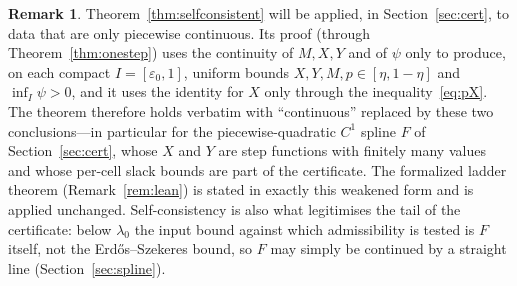 \documentclass[11pt]{article}
\theoremstyle{definition}
\newtheorem{remark}[theorem]{Remark}
\newcommand{\eps}{\varepsilon}
\newcommand{\lam}{\lambda}
\begin{document}
\begin{remark}\label{rem:weak}
Theorem~\ref{thm:selfconsistent} will be applied, in Section~\ref{sec:cert}, to data that are only piecewise continuous.  Its proof (through Theorem~\ref{thm:onestep}) uses the continuity of $M,X,Y$ and of $\psi$ only to produce, on each compact $I=[\eps_0,1]$, uniform bounds $X,Y,M,p\in[\eta,1-\eta]$ and $\inf_I\psi>0$, and it uses the identity for $X$ only through the inequality~\eqref{eq:pX}.  The theorem therefore holds verbatim with ``continuous'' replaced by these two conclusions---in particular for the piecewise-quadratic $C^1$ spline $F$ of Section~\ref{sec:cert}, whose $X$ and $Y$ are step functions with finitely many values and whose per-cell slack bounds are part of the certificate.  The formalized ladder theorem (Remark~\ref{rem:lean}) is stated in exactly this weakened form and is applied unchanged.  Self-consistency is also what legitimises the tail of the certificate: below $\lam_0$ the input bound against which admissibility is tested is $F$ itself, not the Erd\H{o}s--Szekeres bound, so $F$ may simply be continued by a straight line (Section~\ref{sec:spline}).
\end{remark}
\end{document}
